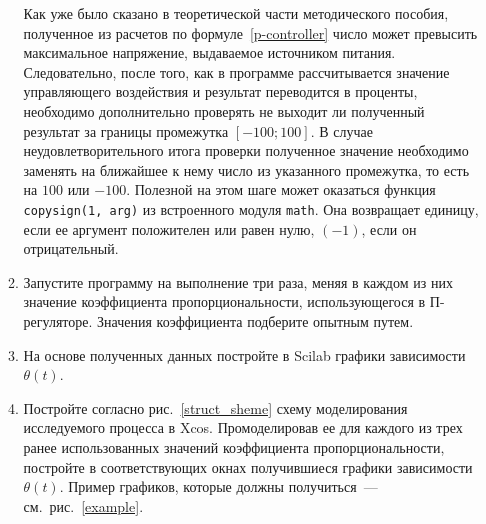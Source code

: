 \documentclass[12pt,a4paper,openany]{extarticle}
\begin{document}
\begin{enumerate}
\begin{enumerate}
		Как уже было сказано в теоретической части методического пособия, полученное из расчетов по формуле~\eqref{p-controller} число может превысить максимальное напряжение, выдаваемое источником питания.
		Следовательно, после того, как в программе рассчитывается значение управляющего воздействия и результат переводится в проценты, необходимо дополнительно проверять не выходит ли полученный результат за границы промежутка  $[-100;100]$.
		В случае неудовлетворительного итога проверки полученное значение необходимо заменять на ближайшее к нему число из указанного промежутка, то есть на $100$ или $-100$. 
		Полезной на этом шаге может оказаться функция \verb|copysign(1, arg)| из встроенного модуля \verb|math|.
		Она возвращает единицу, если ее аргумент положителен или равен нулю, $(-1)$, если он отрицательный.
		\item Запустите программу на выполнение три раза, меняя в каждом из них значение коэффициента пропорциональности, использующегося в П-регуляторе.
		Значения коэффициента подберите опытным путем.
		\item На основе полученных данных постройте в Scilab графики зависимости $\theta(t)$.
		\item Постройте согласно рис.~\ref{struct_sheme} схему моделирования исследуемого процесса в Xcos.
		Промоделировав ее для каждого из трех ранее использованных значений коэффициента пропорциональности, постройте в соответствующих окнах получившиеся графики зависимости $\theta(t)$.
		Пример графиков, которые должны получиться~--- см.~рис.~\ref{example}.
		

\end{enumerate}
\end{enumerate}
\end{document}
